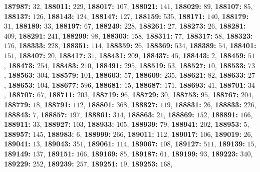 \textsf{\bfseries 187987:} $32$, \textsf{\bfseries 188011:} $229$, \textsf{\bfseries 188017:} $107$, \textsf{\bfseries 188021:} $141$, \textsf{\bfseries 188029:} $89$, \textsf{\bfseries 188107:} $85$, \textsf{\bfseries 188137:} $126$, \textsf{\bfseries 188143:} $124$, \textsf{\bfseries 188147:} $127$, \textsf{\bfseries 188159:} $535$, \textsf{\bfseries 188171:} $140$, \textsf{\bfseries 188179:} $31$, \textsf{\bfseries 188189:} $33$, \textsf{\bfseries 188197:} $67$, \textsf{\bfseries 188249:} $228$, \textsf{\bfseries 188261:} $27$, \textsf{\bfseries 188273:} $26$, \textsf{\bfseries 188281:} $409$, \textsf{\bfseries 188291:} $241$, \textsf{\bfseries 188299:} $98$, \textsf{\bfseries 188303:} $158$, \textsf{\bfseries 188311:} $77$, \textsf{\bfseries 188317:} $58$, \textsf{\bfseries 188323:} $176$, \textsf{\bfseries 188333:} $228$, \textsf{\bfseries 188351:} $114$, \textsf{\bfseries 188359:} $26$, \textsf{\bfseries 188369:} $534$, \textsf{\bfseries 188389:} $54$, \textsf{\bfseries 188401:} $151$, \textsf{\bfseries 188407:} $20$, \textsf{\bfseries 188417:} $31$, \textsf{\bfseries 188431:} $209$, \textsf{\bfseries 188437:} $45$, \textsf{\bfseries 188443:} $2$, \textsf{\bfseries 188459:} $51$, \textsf{\bfseries 188473:} $254$, \textsf{\bfseries 188483:} $210$, \textsf{\bfseries 188491:} $295$, \textsf{\bfseries 188519:} $53$, \textsf{\bfseries 188527:} $10$, \textsf{\bfseries 188533:} $73$, \textsf{\bfseries 188563:} $304$, \textsf{\bfseries 188579:} $101$, \textsf{\bfseries 188603:} $57$, \textsf{\bfseries 188609:} $235$, \textsf{\bfseries 188621:} $82$, \textsf{\bfseries 188633:} $27$, \textsf{\bfseries 188653:} $104$, \textsf{\bfseries 188677:} $596$, \textsf{\bfseries 188681:} $15$, \textsf{\bfseries 188687:} $171$, \textsf{\bfseries 188693:} $41$, \textsf{\bfseries 188701:} $34$, \textsf{\bfseries 188707:} $67$, \textsf{\bfseries 188711:} $203$, \textsf{\bfseries 188719:} $96$, \textsf{\bfseries 188729:} $30$, \textsf{\bfseries 188753:} $95$, \textsf{\bfseries 188767:} $204$, \textsf{\bfseries 188779:} $18$, \textsf{\bfseries 188791:} $112$, \textsf{\bfseries 188801:} $368$, \textsf{\bfseries 188827:} $119$, \textsf{\bfseries 188831:} $26$, \textsf{\bfseries 188833:} $226$, \textsf{\bfseries 188843:} $7$, \textsf{\bfseries 188857:} $197$, \textsf{\bfseries 188861:} $314$, \textsf{\bfseries 188863:} $21$, \textsf{\bfseries 188869:} $152$, \textsf{\bfseries 188891:} $166$, \textsf{\bfseries 188911:} $33$, \textsf{\bfseries 188927:} $103$, \textsf{\bfseries 188933:} $105$, \textsf{\bfseries 188939:} $79$, \textsf{\bfseries 188941:} $202$, \textsf{\bfseries 188953:} $5$, \textsf{\bfseries 188957:} $145$, \textsf{\bfseries 188983:} $6$, \textsf{\bfseries 188999:} $266$, \textsf{\bfseries 189011:} $112$, \textsf{\bfseries 189017:} $106$, \textsf{\bfseries 189019:} $26$, \textsf{\bfseries 189041:} $13$, \textsf{\bfseries 189043:} $351$, \textsf{\bfseries 189061:} $114$, \textsf{\bfseries 189067:} $108$, \textsf{\bfseries 189127:} $511$, \textsf{\bfseries 189139:} $15$, \textsf{\bfseries 189149:} $137$, \textsf{\bfseries 189151:} $166$, \textsf{\bfseries 189169:} $85$, \textsf{\bfseries 189187:} $61$, \textsf{\bfseries 189199:} $93$, \textsf{\bfseries 189223:} $340$, \textsf{\bfseries 189229:} $252$, \textsf{\bfseries 189239:} $257$, \textsf{\bfseries 189251:} $19$, \textsf{\bfseries 189253:} $168$, 
